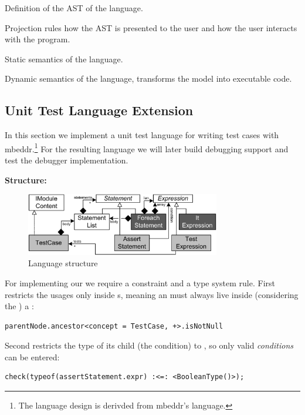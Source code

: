  Definition of the \ac{AST} of the language.

 Projection rules how the \ac{AST} is presented to the user and how the user interacts with the program.

 Static semantics of the language.
 
 Dynamic semantics of the language, transforms the model into executable code.

\subsection{Unit Test Language Extension}

In this section we implement a unit test language
for writing test cases with mbeddr.\footnote{The language design is derivded 
from mbeddr's  language.}  For the resulting language we will later
build debugging support and test the debugger implementation.

\noindent \textbf{Structure:}


\begin{figure}[h]
  \vspace{-2mm}
  \centering
    \includegraphics[width=8.5cm]{./figures/umldiag.png} 
    \vspace{-2mm}
    \caption{Language structure}
  \label{fig:UnitTestStructure}
  \vspace{-2mm}
\end{figure}


For implementing our  we require a constraint and a type
system rule. First restricts the usages only inside s, meaning an
 must always live inside (considering the ) a
:
\begin{lstlisting}[language=mbeddr,frame=single]
parentNode.ancestor<concept = TestCase, +>.isNotNull
\end{lstlisting}

Second restricts the type of its child  (the condition) to
, so only valid \emph{conditions} can be entered:
\begin{lstlisting}[language=mbeddr,frame=single]
check(typeof(assertStatement.expr) :<=: <BooleanType()>);
\end{lstlisting}

